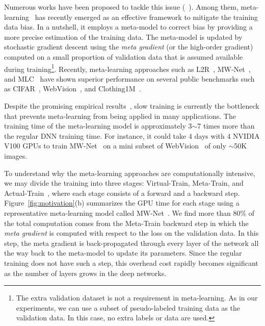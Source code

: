 \documentclass[final]{cvpr}
\begin{document}
Numerous works have been proposed to tackle this issue (\eg~\cite{jiang2017mentornet, han2018co, ren2018learning, li2020dividemix, lin2017focal}). Among them, meta-learning~\cite{ren2018learning, shu2019meta, wang2020training} has recently emerged as an effective framework to mitigate the training data bias. In a nutshell, it employs a meta-model to correct bias by providing a more precise estimation of the training data. The meta-model is updated by stochastic gradient descent using the \emph{meta gradient} (or the high-order gradient) computed on a small proportion of validation data that is assumed available during training\footnote{The extra validation dataset is not a requirement in meta-learning. As in our experiments, we can use a subset of pseudo-labeled training data as the validation data. In this case, no extra labels or data are used.}.
Recently, meta-learning approaches such as L2R~\cite{ren2018learning}, MW-Net~\cite{shu2019meta}, and MLC~\cite{wang2020training} have shown superior performance on several public benchmarks such as CIFAR~\cite{krizhevsky2009learning}, WebVision~\cite{li2017webvision}, and Clothing1M~\cite{xiao2015learning}.

Despite the promising empirical results~\cite{vyas2020learning,shu2020meta}, slow training is currently the bottleneck that prevents meta-learning from being applied in many applications.
The training time of the meta-learning model is approximately 3$\sim$7 times more than the regular DNN training time. For instance, it could take 4 days with 4 NVIDIA V100 GPUs to train MW-Net~\cite{shu2019meta} on a mini subset of WebVision~\cite{li2017webvision,jiang2017mentornet} of only $\sim$50K images.


To understand why the meta-learning approaches are computationally intensive,
we may divide the training into three stages: Virtual-Train, Meta-Train, and Actual-Train~\cite{wang2020training}, where each stage consists of a forward and a backward step. Figure~\ref{fig:motivation}(b) summarizes the GPU time for each stage using a representative meta-learning model called MW-Net~\cite{shu2019meta}. We find more than 80\% of the total computation comes from the Meta-Train backward step in which the \emph{meta gradient} is computed with respect to the loss on the validation data. In this step, the meta gradient is back-propagated through every layer of the network all the way back to the meta-model to update its parameters. Since the regular training does not have such a step, this overhead cost rapidly becomes significant as the number of layers grows in the deep networks.
\end{document}
